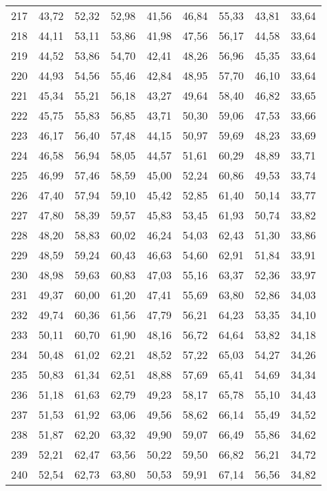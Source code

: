 \begin{longtable}{c c c c c c c c c}
217	& 43,72	& 52,32	& 52,98	& 41,56	& 46,84	& 55,33	& 43,81	& 33,64 \\
218	& 44,11	& 53,11	& 53,86	& 41,98	& 47,56	& 56,17	& 44,58	& 33,64 \\
219	& 44,52	& 53,86	& 54,70	& 42,41	& 48,26	& 56,96	& 45,35	& 33,64 \\
220	& 44,93	& 54,56	& 55,46	& 42,84	& 48,95	& 57,70	& 46,10	& 33,64 \\
221	& 45,34	& 55,21	& 56,18	& 43,27	& 49,64	& 58,40	& 46,82	& 33,65 \\
222	& 45,75	& 55,83	& 56,85	& 43,71	& 50,30	& 59,06	& 47,53	& 33,66 \\
223	& 46,17	& 56,40	& 57,48	& 44,15	& 50,97	& 59,69	& 48,23	& 33,69 \\
224	& 46,58	& 56,94	& 58,05	& 44,57	& 51,61	& 60,29	& 48,89	& 33,71 \\
225	& 46,99	& 57,46	& 58,59	& 45,00	& 52,24	& 60,86	& 49,53	& 33,74 \\
226	& 47,40	& 57,94	& 59,10	& 45,42	& 52,85	& 61,40	& 50,14	& 33,77 \\
227	& 47,80	& 58,39	& 59,57	& 45,83	& 53,45	& 61,93	& 50,74	& 33,82 \\
228	& 48,20	& 58,83	& 60,02	& 46,24	& 54,03	& 62,43	& 51,30	& 33,86 \\
229	& 48,59	& 59,24	& 60,43	& 46,63	& 54,60	& 62,91	& 51,84	& 33,91 \\
230	& 48,98	& 59,63	& 60,83	& 47,03	& 55,16	& 63,37	& 52,36	& 33,97 \\
231	& 49,37	& 60,00	& 61,20	& 47,41	& 55,69	& 63,80	& 52,86	& 34,03 \\
232	& 49,74	& 60,36	& 61,56	& 47,79	& 56,21	& 64,23	& 53,35	& 34,10 \\
233	& 50,11	& 60,70	& 61,90	& 48,16	& 56,72	& 64,64	& 53,82	& 34,18 \\
234	& 50,48	& 61,02	& 62,21	& 48,52	& 57,22	& 65,03	& 54,27	& 34,26 \\
235	& 50,83	& 61,34	& 62,51	& 48,88	& 57,69	& 65,41	& 54,69	& 34,34 \\
236	& 51,18	& 61,63	& 62,79	& 49,23	& 58,17	& 65,78	& 55,10	& 34,43 \\
237	& 51,53	& 61,92	& 63,06	& 49,56	& 58,62	& 66,14	& 55,49	& 34,52 \\
238	& 51,87	& 62,20	& 63,32	& 49,90	& 59,07	& 66,49	& 55,86	& 34,62 \\
239	& 52,21	& 62,47	& 63,56	& 50,22	& 59,50	& 66,82	& 56,21	& 34,72 \\
240	& 52,54	& 62,73	& 63,80	& 50,53	& 59,91	& 67,14	& 56,56	& 34,82 \\

\end{longtable}
